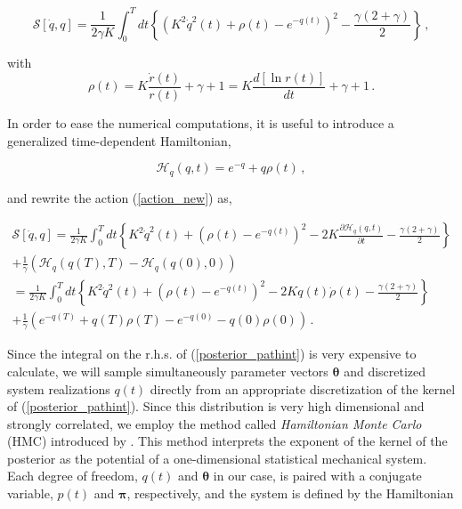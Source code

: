 \documentclass[11pt, a4paper]{article}
\newcommand{\bt}{\pmb\theta}
\newcommand{\dt}{\mathit{dt}}
\begin{document}
\begin{equation}\label{action_new}
{\mathcal S}[\dot{q},q]
=
\frac{1}{2\gamma K}
\int_0^T \dt \left\{\left(
    K^2\dot q^2(t) +
    \rho(t)-e^{-q(t)}\right)^2 -
    \frac{\gamma(2+\gamma)}{2}
\right\} \,,
\end{equation}

with
\begin{equation}\label{rho}
\rho(t)=K\frac{\dot r(t)}{r(t)}+\gamma+1 = K\frac{d \left[\ln r(t)\right]}{dt}+\gamma+1\,.
\end{equation}

In order to ease the numerical computations, it is useful to introduce a generalized time-dependent Hamiltonian,

\begin{equation}\label{H}
  \mathcal{H}_q(q,t)
  =
  e^{-q}+q\rho(t)\,,
\end{equation}

and rewrite the action (\ref{action_new}) as,

\begin{multline}\label{action_final}
{\mathcal S}[\dot{q},q]
=
\frac{1}{2\gamma K}
\int_0^T dt\left\{
    K^2\dot q^2(t) +
    (\rho(t)-e^{-q(t)})^2 -
    2K\frac{\partial \mathcal{H}_q(q,t)}{\partial t} -
    \frac{\gamma(2+\gamma)}{2}
\right\}
\\
+
\frac{1}{\gamma}\left(
    \mathcal{H}_q(q(T),T) - \mathcal{H}_q(q(0),0)
\right)
\\
= \frac{1}{2\gamma K}
\int_0^T dt\left\{
    K^2\dot q^2(t) +
    (\rho(t)-e^{-q(t)})^2 -
    2Kq(t)\dot\rho(t) -
    \frac{\gamma(2+\gamma)}{2}
\right\}
\\
+
\frac{1}{\gamma}\left(
    e^{-q(T)}+q(T)\rho(T)
    -e^{-q(0)}-q(0)\rho(0)
\right)
\,.
\end{multline}

Since the integral on the r.h.s. of (\ref{posterior_pathint}) is very expensive to calculate, we will sample simultaneously parameter vectors $\bt$ and discretized system realizations $q(t)$ directly from an appropriate discretization of the kernel of (\ref{posterior_pathint}).
Since this distribution is very high dimensional and strongly correlated, we employ the method called {\em Hamiltonian Monte Carlo} (HMC) introduced by \cite{duane_1987_HMC}.
This method interprets the exponent of the kernel of the posterior as the potential of a one-dimensional statistical mechanical system. Each degree of freedom, $q(t)$ and $\bt$ in our case, is paired with a conjugate variable, $p(t)$ and ${\pmb\pi}$, respectively, and the system is defined by the  Hamiltonian
\end{document}
